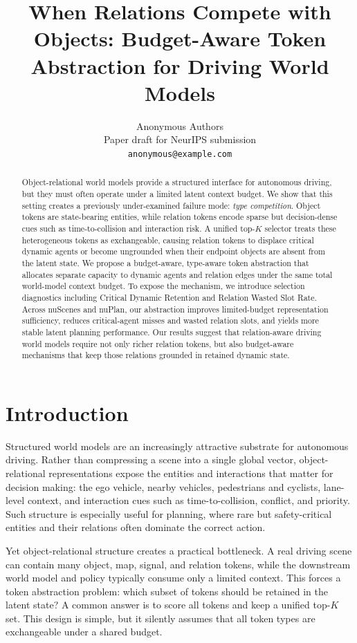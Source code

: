 \documentclass[10pt]{article}
\title{\vspace{-1.0em}When Relations Compete with Objects: Budget-Aware Token Abstraction for Driving World Models}
\author{
Anonymous Authors\\
Paper draft for NeurIPS submission\\
\texttt{anonymous@example.com}
}
\date{}
\begin{document}
\maketitle

\begin{abstract}
Object-relational world models provide a structured interface for autonomous driving, but they must often operate under a limited latent context budget. We show that this setting creates a previously under-examined failure mode: \emph{type competition}. Object tokens are state-bearing entities, while relation tokens encode sparse but decision-dense cues such as time-to-collision and interaction risk. A unified top-$K$ selector treats these heterogeneous tokens as exchangeable, causing relation tokens to displace critical dynamic agents or become ungrounded when their endpoint objects are absent from the latent state. We propose a budget-aware, type-aware token abstraction that allocates separate capacity to dynamic agents and relation edges under the same total world-model context budget. To expose the mechanism, we introduce selection diagnostics including Critical Dynamic Retention and Relation Wasted Slot Rate. Across nuScenes and nuPlan, our abstraction improves limited-budget representation sufficiency, reduces critical-agent misses and wasted relation slots, and yields more stable latent planning performance. Our results suggest that relation-aware driving world models require not only richer relation tokens, but also budget-aware mechanisms that keep those relations grounded in retained dynamic state.
\end{abstract}

\section{Introduction}
Structured world models are an increasingly attractive substrate for autonomous driving. Rather than compressing a scene into a single global vector, object-relational representations expose the entities and interactions that matter for decision making: the ego vehicle, nearby vehicles, pedestrians and cyclists, lane-level context, and interaction cues such as time-to-collision, conflict, and priority. Such structure is especially useful for planning, where rare but safety-critical entities and their relations often dominate the correct action.

Yet object-relational structure creates a practical bottleneck. A real driving scene can contain many object, map, signal, and relation tokens, while the downstream world model and policy typically consume only a limited context. This forces a token abstraction problem: which subset of tokens should be retained in the latent state? A common answer is to score all tokens and keep a unified top-$K$ set. This design is simple, but it silently assumes that all token types are exchangeable under a shared budget.
\end{document}
